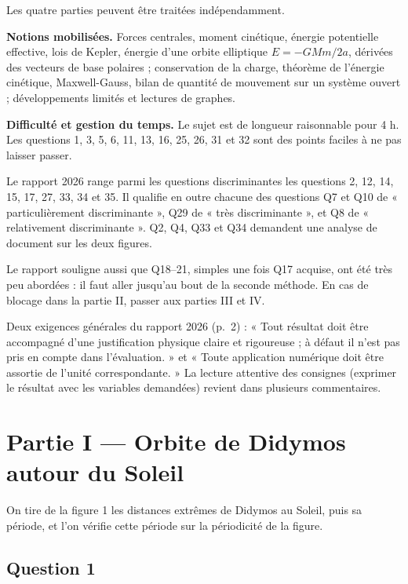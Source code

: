 \documentclass[11pt,a4paper]{article}
\begin{document}
Les quatre parties peuvent être traitées indépendamment.

\textbf{Notions mobilisées.} Forces centrales, moment cinétique, énergie potentielle effective, lois de Kepler, énergie d'une orbite elliptique \(E=-GMm/2a\), dérivées des vecteurs de base polaires ; conservation de la charge, théorème de l'énergie cinétique, Maxwell-Gauss, bilan de quantité de mouvement sur un système ouvert ; développements limités et lectures de graphes.

\textbf{Difficulté et gestion du temps.} Le sujet est de longueur raisonnable pour 4 h. Les questions 1, 3, 5, 6, 11, 13, 16, 25, 26, 31 et 32 sont des points faciles à ne pas laisser passer.

Le rapport 2026 range parmi les questions discriminantes les questions 2, 12, 14, 15, 17, 27, 33, 34 et 35. Il qualifie en outre chacune des questions Q7 et Q10 de « particulièrement discriminante », Q29 de « très discriminante », et Q8 de « relativement discriminante ». Q2, Q4, Q33 et Q34 demandent une analyse de document sur les deux figures.

Le rapport souligne aussi que Q18--21, simples une fois Q17 acquise, ont été très peu abordées : il faut aller jusqu'au bout de la seconde méthode. En cas de blocage dans la partie II, passer aux parties III et IV.

\begin{jury}

Deux exigences générales du rapport 2026 (p.~2) : « Tout résultat doit être accompagné d'une justification physique claire et rigoureuse ; à défaut il n'est pas pris en compte dans l'évaluation. » et « Toute application numérique doit être assortie de l'unité correspondante. » La lecture attentive des consignes (exprimer le résultat avec les variables demandées) revient dans plusieurs commentaires.

\end{jury}

\hypertarget{partie-i-orbite-de-didymos-autour-du-soleil}{%
\section{Partie I --- Orbite de Didymos autour du Soleil}\label{partie-i-orbite-de-didymos-autour-du-soleil}}

On tire de la figure 1 les distances extrêmes de Didymos au Soleil, puis sa période, et l'on vérifie cette période sur la périodicité de la figure.

\hypertarget{question-1}{%
\subsection{Question 1}\label{question-1}}
\end{document}
